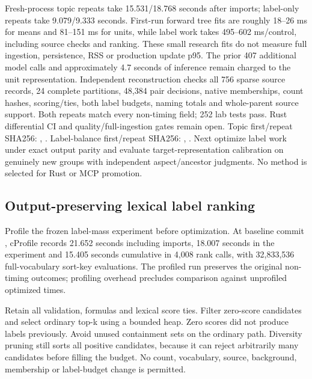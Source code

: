 \documentclass[11pt]{article}
\begin{document}
Fresh-process topic repeats take 15.531/18.768 seconds after imports; label-only
repeats take 9.079/9.333 seconds. First-run forward tree fits are roughly
18--26 ms for means and 81--151 ms for units, while label work takes
495--602 ms/control, including source checks and ranking. These small research
fits do not measure full ingestion, persistence, RSS or production update p95.
The prior 407 additional model calls and approximately 4.7 seconds of inference
remain charged to the unit representation. Independent reconstruction checks
all 756 sparse source records, 24 complete partitions, 48,384 pair decisions,
native memberships, count hashes, scoring/ties, both label budgets, naming totals
and whole-parent source support. Both repeats match every non-timing field;
252 lab tests pass. Rust differential CI and quality/full-ingestion gates remain
open. Topic first/repeat SHA256:
,
.
Label-balance first/repeat SHA256:
,
.
Next optimize label work under exact output parity and evaluate target-representation
calibration on genuinely new groups with independent aspect/ancestor judgments.
No method is selected for Rust or MCP promotion.

\subsection{Output-preserving lexical label ranking}
Profile the frozen label-mass experiment before optimization. At baseline commit
, cProfile records 21.652 seconds
including imports, 18.007 seconds in the experiment and 15.405 seconds cumulative
in 4,008 rank calls, with 32,833,536 full-vocabulary sort-key evaluations.
The profiled run preserves the original non-timing outcomes; profiling overhead
precludes comparison against unprofiled optimized times.

Retain all validation, formulas and lexical score ties. Filter zero-score
candidates and select ordinary top-k using a bounded heap. Zero scores did not
produce labels previously. Avoid unused containment sets on the ordinary path.
Diversity pruning still sorts all positive candidates, because it can reject
arbitrarily many candidates before filling the budget. No count, vocabulary,
source, background, membership or label-budget change is permitted.
\end{document}
